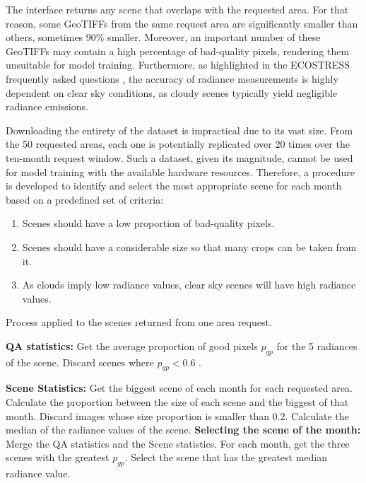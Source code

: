 The interface returns any scene that overlaps with the requested area. For that reason, some GeoTIFFs from the same request area are significantly smaller than others, sometimes 90\% smaller. Moreover, an important number of these GeoTIFFs may contain a high percentage of bad-quality pixels, rendering them unsuitable for model training. Furthermore, as highlighted in the ECOSTRESS frequently asked questions \cite{ecostress_faq}, the accuracy of radiance measurements is highly dependent on clear sky conditions, as cloudy scenes typically yield negligible radiance emissions.

Downloading the entirety of the dataset is impractical due to its vast size.  
From the 50 requested areas, each one is potentially replicated over 20 times over the ten-month request window.
Such a dataset, given its magnitude, cannot be used for model training with the available hardware resources.
Therefore, a procedure is developed to identify and select the most appropriate scene for each month based on a predefined set of criteria:

\begin{enumerate}
\item Scenes should have a low proportion of bad-quality pixels.
\item Scenes should have a considerable size so that many crops can be taken from it.
\item As clouds imply low radiance values, clear sky scenes will have high radiance values.
\end{enumerate}


\begin{algorithm}[H] \label{alg:dataprocessing}
\caption{Process applied to the scenes returned from one area request.}
\begin{algorithmic}[1]

\State \textbf{QA statistics:}
\State Get the average proportion of good pixels $p_{gp}$ for the 5 radiances of the scene.
\State Discard scenes where $p_{gp} < 0.6 $ .

\State \textbf{Scene Statistics:}
\State Get the biggest scene of each month for each requested area.
\State Calculate the proportion between the size of each scene and the biggest of that month.
\State Discard images whose size proportion is smaller than 0.2.
\State Calculate the median of the radiance values of the scene.
\State \textbf{Selecting the scene of the month:}
\State Merge the QA statistics and the Scene statistics.
\State For each month, get the three scenes with the greatest $p_{gp}$.
\State Select the scene that has the greatest median radiance value.
\end{algorithmic}
\end{algorithm}


